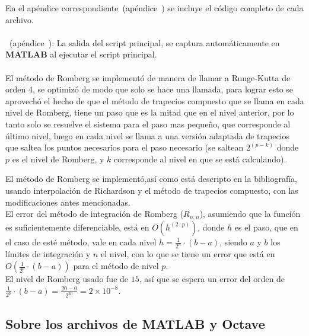 En el apéndice correspondiente~(apéndice~) se incluye el código completo de cada archivo.\\\\

\textbf{}~(apéndice~): La salida del script principal, se captura automáticamente en \textbf{MATLAB} al ejecutar el script principal.\\\\


El método de Romberg se implementó de manera de llamar a Runge-Kutta de orden 4, se optimizó de modo que solo se hace una llamada, para lograr esto se aprovechó el hecho de que el método de trapecios compuesto que se llama en cada nivel de Romberg, tiene un paso que es la mitad que en el nivel anterior, por lo tanto solo se resuelve el sistema para el paso mas pequeño, que corresponde al último nivel, luego en cada nivel se llama a una versión adaptada de trapecios que saltea los puntos necesarios para el paso necesario (se saltean $2^{(p - k)}$ donde $p$ es el nivel de Romberg, y $k$ corresponde al nivel en que se está calculando).

El método de Romberg se implementó,así como está descripto en la bibliografía, usando interpolación de Richardson y el método de trapecios compuesto, con las modificaciones antes mencionadas.\\

El error del método de integración de Romberg ($R_{n,n}$), asumiendo que la función es suficientemente diferenciable, está en $O \left(  h^{\left( 2 \cdot p  \right)}  \right)$, donde $h$ es el paso, que en el caso de esté método, vale en cada nivel $h = \frac{1}{2^{n}} \cdot \left( b - a \right)$, siendo $a$ y $b$ los límites de integración y $n$ el nivel, con lo que se tiene un error que está en $O \left( \frac{1}{2^{p}} \cdot \left( b - a \right)  \right)$ para el método de nivel $p$.\\

El nivel de Romberg usado fue de $15$, así que se espera un error del orden de $\frac{1}{2^{p}} \cdot \left( b - a \right) = \frac{20 - 0}{2^{30}} = 2 \times 10^{-8}$.




\clearpage

\subsection{Sobre los archivos de \textbf{MATLAB} y \textbf{Octave}}

